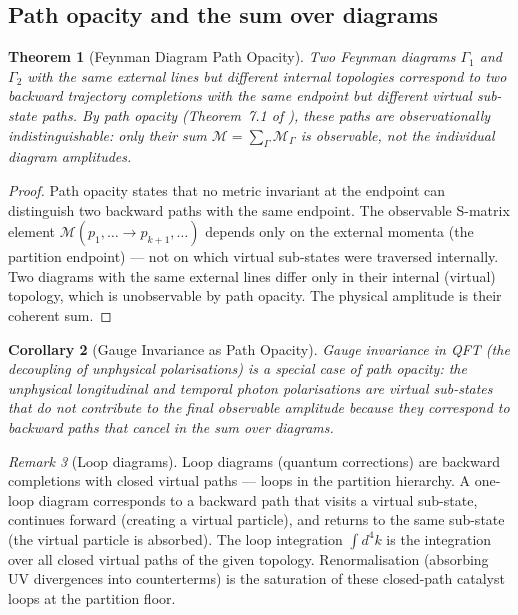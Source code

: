 \documentclass[twocolumn,10pt,a4paper]{article}
\theoremstyle{thmstyle}
\newtheorem{theorem}{Theorem}[section]
\newtheorem{corollary}[theorem]{Corollary}
\theoremstyle{definition}
\theoremstyle{remark}
\newtheorem{remark}[theorem]{Remark}
\begin{document}
\subsection{Path opacity and the sum over diagrams}

\begin{theorem}[Feynman Diagram Path Opacity]
\label{thm:feynman_opacity}
Two Feynman diagrams $\Gamma_1$ and $\Gamma_2$ with the same external
lines but different internal topologies correspond to two backward
trajectory completions with the same endpoint but different virtual
sub-state paths. By path opacity (Theorem~7.1 of \citealt{companion:trajectory}),
these paths are observationally indistinguishable: only their sum
$\mathcal{M} = \sum_\Gamma\mathcal{M}_\Gamma$ is observable, not the
individual diagram amplitudes.
\end{theorem}

\begin{proof}
Path opacity states that no metric invariant at the endpoint can
distinguish two backward paths with the same endpoint. The observable
S-matrix element $\mathcal{M}(p_1,\ldots\to p_{k+1},\ldots)$ depends
only on the external momenta (the partition endpoint) --- not on which
virtual sub-states were traversed internally. Two diagrams with the same
external lines differ only in their internal (virtual) topology, which
is unobservable by path opacity. The physical amplitude is their coherent sum.
\end{proof}

\begin{corollary}[Gauge Invariance as Path Opacity]
\label{cor:gauge}
Gauge invariance in QFT (the decoupling of unphysical polarisations)
is a special case of path opacity: the unphysical longitudinal and
temporal photon polarisations are virtual sub-states that do not
contribute to the final observable amplitude because they correspond to
backward paths that cancel in the sum over diagrams.
\end{corollary}

\begin{remark}[Loop diagrams]
Loop diagrams (quantum corrections) are backward completions with closed
virtual paths --- loops in the partition hierarchy. A one-loop diagram
corresponds to a backward path that visits a virtual sub-state, continues
forward (creating a virtual particle), and returns to the same sub-state
(the virtual particle is absorbed). The loop integration $\int d^4k$ is
the integration over all closed virtual paths of the given topology.
Renormalisation (absorbing UV divergences into counterterms) is the
saturation of these closed-path catalyst loops at the partition floor.
\end{remark}
\end{document}
